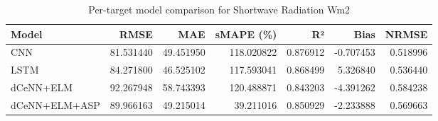 \begin{table}
\caption{Per-target model comparison for Shortwave Radiation Wm2}
\begin{tabular}{lrrrrrr}
\toprule
Model & RMSE & MAE & sMAPE (\%) & R² & Bias & NRMSE \\
\midrule
CNN & 81.531440 & 49.451950 & 118.020822 & 0.876912 & -0.707453 & 0.518996 \\
LSTM & 84.271800 & 46.525102 & 117.593041 & 0.868499 & 5.326840 & 0.536440 \\
dCeNN+ELM & 92.267948 & 58.743393 & 120.488871 & 0.843203 & -4.391262 & 0.584238 \\
dCeNN+ELM+ASP & 89.966163 & 49.215014 & 39.211016 & 0.850929 & -2.233888 & 0.569663 \\
\bottomrule
\end{tabular}
\end{table}
